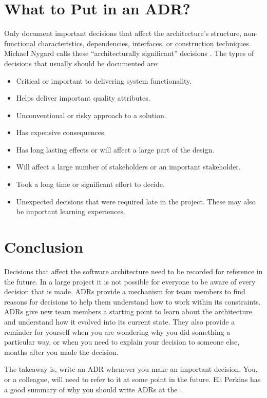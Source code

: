 \section{What to Put in an ADR?}
Only document important decisions that affect the architecture's structure,
non-functional characteristics, dependencies, interfaces, or construction techniques.
Michael Nygard calls these ``architecturally significant'' decisions \cite{nygard-adr}.
The types of decisions that usually should be documented are:
\begin{itemize}[noitemsep]
    \item Critical or important to delivering system functionality.
    \item Helps deliver important quality attributes.
    \item Unconventional or risky approach to a solution.
    \item Has expensive consequences.
    \item Has long lasting effects or will affect a large part of the design.
    \item Will affect a large number of stakeholders or an important stakeholder.
    \item Took a long time or significant effort to decide.
    \item Unexpected decisions that were required late in the project. These may also be important learning experiences.
\end{itemize}

\section{Conclusion}
Decisions that affect the software architecture need to be recorded for reference in the future.
In a large project it is not possible for everyone to be aware of every decision that is made.
ADRs provide a mechanism for team members to find reasons for decisions to help them understand how to work within its constraints.
ADRs give new team members a starting point to learn about the architecture and understand how it evolved into its current state.
They also provide a reminder for yourself when you are wondering why you did something a particular way,
or when you need to explain your decision to someone else, months after you made the decision.

The takeaway is, write an ADR whenever you make an important decision.
You, or a colleague, will need to refer to it at some point in the future.
Eli Perkins has a good summary of why you should write ADRs at the
 \cite{why-write-adrs}.
